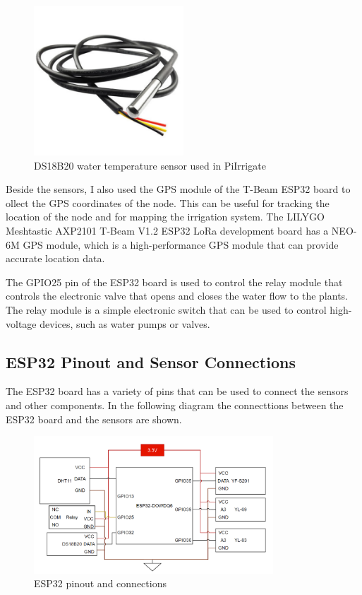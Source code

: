 \begin{figure}[H]
    \centering
    \includegraphics[width=0.5\textwidth]{images/water-temp.png}
    \caption{DS18B20 water temperature sensor used in PiIrrigate}
    \label{fig:ds18b20}
\end{figure}

Beside the sensors, I also used the GPS module of the T-Beam ESP32 board to 
ollect the GPS coordinates of the node. 
This can be useful for tracking the location of the node and for mapping the irrigation system.
The LILYGO Meshtastic AXP2101 T-Beam V1.2 ESP32 LoRa development board has a
NEO-6M GPS module, which is a high-performance GPS module that can provide accurate location data.

The GPIO25 pin of the ESP32 board is used to control the relay module that controls 
the electronic valve that opens and closes the water flow to the plants.
The relay module is a simple electronic switch that 
can be used to control high-voltage devices, such as water pumps or valves.

\subsection{ESP32 Pinout and Sensor Connections}
The ESP32 board has a variety of pins that can be used to connect the sensors and other components.
In the following diagram the connecttions between the ESP32 board and the sensors are shown.
\begin{figure}[H]
    \centering
    \includegraphics[width=0.8\textwidth]{images/esp-diagram.png}
    \caption{ESP32 pinout and connections}
    \label{fig:esp32-pinout}
\end{figure}

